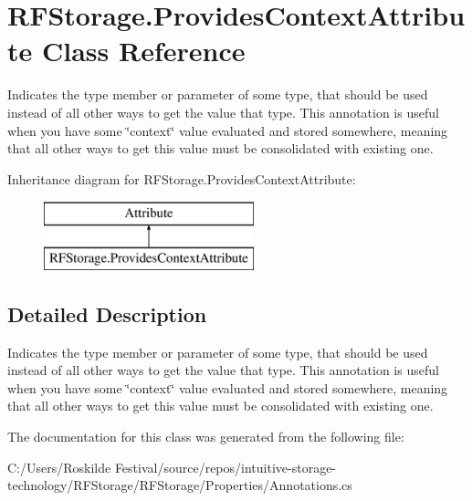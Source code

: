 \hypertarget{class_r_f_storage_1_1_provides_context_attribute}{}\section{R\+F\+Storage.\+Provides\+Context\+Attribute Class Reference}
\label{class_r_f_storage_1_1_provides_context_attribute}


Indicates the type member or parameter of some type, that should be used instead of all other ways to get the value that type. This annotation is useful when you have some \char`\"{}context\char`\"{} value evaluated and stored somewhere, meaning that all other ways to get this value must be consolidated with existing one.  


Inheritance diagram for R\+F\+Storage.\+Provides\+Context\+Attribute\+:\begin{figure}[H]
\begin{center}
\leavevmode
\includegraphics[height=2.000000cm]{class_r_f_storage_1_1_provides_context_attribute}
\end{center}
\end{figure}


\subsection{Detailed Description}
Indicates the type member or parameter of some type, that should be used instead of all other ways to get the value that type. This annotation is useful when you have some \char`\"{}context\char`\"{} value evaluated and stored somewhere, meaning that all other ways to get this value must be consolidated with existing one. 


\begin{DoxyCode}{0}
\DoxyCodeLine{}
\DoxyCodeLine{    \textcolor{comment}{//              \string^ Warning: use value of '\_barService' field}}
\DoxyCodeLine{  \}}
\DoxyCodeLine{\}}
\end{DoxyCode}


The documentation for this class was generated from the following file\+:\begin{DoxyCompactItemize}
\item 
C\+:/\+Users/\+Roskilde Festival/source/repos/intuitive-\/storage-\/technology/\+R\+F\+Storage/\+R\+F\+Storage/\+Properties/Annotations.\+cs\end{DoxyCompactItemize}
